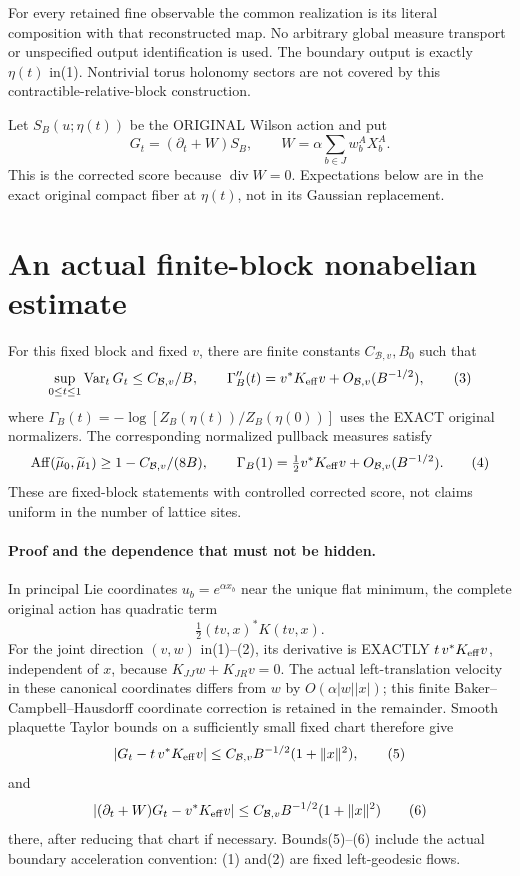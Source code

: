 \documentclass{article}
\begin{document}
For every retained fine observable the common realization is its literal composition with that reconstructed map. No arbitrary global measure transport or unspecified output identification is used. The boundary output is exactly $\eta(t)$ in(1). Nontrivial torus holonomy sectors are not covered by this contractible-relative-block construction.

Let $S_B(u;\eta(t))$ be the ORIGINAL Wilson action and put
\[
 G_t=(\partial_t+W)S_B,\qquad W=\alpha\sum_{b\in J}w_b^AX_b^A.
\]
This is the corrected score because $\operatorname{div}W=0$. Expectations below are in the exact original compact fiber at $\eta(t)$, not in its Gaussian replacement.

\section*{An actual finite-block nonabelian estimate}
For this fixed block and fixed $v$, there are finite constants $C_{\mathcal B,v},B_0$ such that
\[
 \sup_{0\le t\le1}\operatorname{Var}_tG_t
       \le C_{\mathcal B,v}/B,\qquad
 \Gamma_B''(t)=v^*K_{\rm eff}v+O_{\mathcal B,v}(B^{-1/2}),               \tag{3}
\]
where $\Gamma_B(t)=-\log[Z_B(\eta(t))/Z_B(\eta(0))]$ uses the EXACT original normalizers. The corresponding normalized pullback measures satisfy
\[
 \operatorname{Aff}(\widetilde\mu_0,\widetilde\mu_1)
       \ge1-C_{\mathcal B,v}/(8B),\qquad
 \Gamma_B(1)=\tfrac12v^*K_{\rm eff}v+O_{\mathcal B,v}(B^{-1/2}).         \tag{4}
\]
These are fixed-block statements with controlled corrected score, not claims uniform in the number of lattice sites.

\paragraph{Proof and the dependence that must not be hidden.}
In principal Lie coordinates $u_b=e^{\alpha x_b}$ near the unique flat minimum, the complete original action has quadratic term
\[
 \tfrac12(t v,x)^*K(t v,x).
\]
For the joint direction $(v,w)$ in(1)--(2), its derivative is EXACTLY
$t\,v^*K_{\rm eff}v$, independent of $x$, because $K_{JJ}w+K_{JR}v=0$.
The actual left-translation velocity in these canonical coordinates differs from $w$ by $O(\alpha |w||x|)$; this finite Baker--Campbell--Hausdorff coordinate correction is retained in the remainder. Smooth plaquette Taylor bounds on a sufficiently small fixed chart therefore give
\[
 |G_t-t\,v^*K_{\rm eff}v|
 \le C_{\mathcal B,v}B^{-1/2}(1+\|x\|^2),              \tag{5}
\]
and
\[
 |(\partial_t+W)G_t-v^*K_{\rm eff}v|
 \le C_{\mathcal B,v}B^{-1/2}(1+\|x\|^2)              \tag{6}
\]
there, after reducing that chart if necessary. Bounds(5)--(6) include the actual boundary acceleration convention: (1) and(2) are fixed left-geodesic flows.
\end{document}
